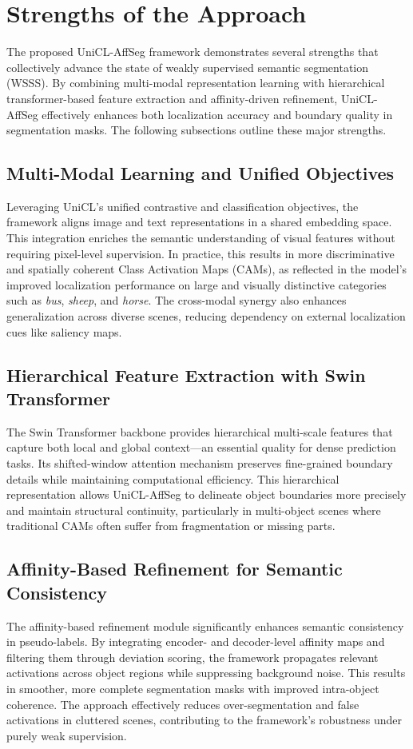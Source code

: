 \section{Strengths of the Approach}
\label{sec:strengths_of_approach}

The proposed UniCL-AffSeg framework demonstrates several strengths that collectively advance the state of weakly supervised semantic segmentation (WSSS). By combining multi-modal representation learning with hierarchical transformer-based feature extraction and affinity-driven refinement, UniCL-AffSeg effectively enhances both localization accuracy and boundary quality in segmentation masks. The following subsections outline these major strengths.

\subsection{Multi-Modal Learning and Unified Objectives}
Leveraging UniCL’s unified contrastive and classification objectives, the framework aligns image and text representations in a shared embedding space. This integration enriches the semantic understanding of visual features without requiring pixel-level supervision. In practice, this results in more discriminative and spatially coherent Class Activation Maps (CAMs), as reflected in the model’s improved localization performance on large and visually distinctive categories such as \textit{bus}, \textit{sheep}, and \textit{horse}. The cross-modal synergy also enhances generalization across diverse scenes, reducing dependency on external localization cues like saliency maps.

\subsection{Hierarchical Feature Extraction with Swin Transformer}
The Swin Transformer backbone provides hierarchical multi-scale features that capture both local and global context—an essential quality for dense prediction tasks. Its shifted-window attention mechanism preserves fine-grained boundary details while maintaining computational efficiency. This hierarchical representation allows UniCL-AffSeg to delineate object boundaries more precisely and maintain structural continuity, particularly in multi-object scenes where traditional CAMs often suffer from fragmentation or missing parts.

\subsection{Affinity-Based Refinement for Semantic Consistency}
The affinity-based refinement module significantly enhances semantic consistency in pseudo-labels. By integrating encoder- and decoder-level affinity maps and filtering them through deviation scoring, the framework propagates relevant activations across object regions while suppressing background noise. This results in smoother, more complete segmentation masks with improved intra-object coherence. The approach effectively reduces over-segmentation and false activations in cluttered scenes, contributing to the framework’s robustness under purely weak supervision.

